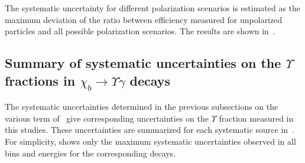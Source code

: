 



The systematic uncertainty for different polarization scenarios is estimated
as the maximum deviation of the ratio between efficiency measured for unpolarized
particles and all possible polarization scenarios. The results  are
shown in~.



\subsection{Summary of systematic uncertainties on the $\Upsilon$ fractions in
$\chi_b \to \Upsilon \gamma$ decays} The systematic uncertainties determined in
the previous subsections on the various term of~ give
corresponding uncertainties on the $\Upsilon$ fraction measured in this
studies. These uncertainties are summarized for each systematic source
in~. For simplicity,
 shows only the maximum systematic uncertainties observed  
in all bins and energies for the corresponding decays.



% 


